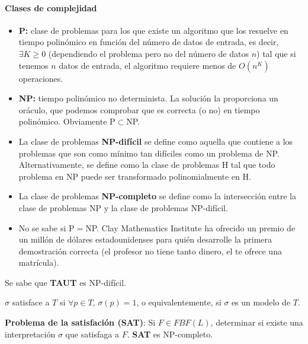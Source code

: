 \paragraph{Clases de complejidad}
\begin{itemize}
	\item \textbf{P:} clase de problemas para los que existe un algoritmo que los resuelve en tiempo polinómico en función del número de datos de entrada, es decir, $\exists K\ge 0$ (dependiendo el problema pero no del número de datos $n$) tal que si tenemos $n$ datos de entrada, el algoritmo requiere menos de $O(n^K)$ operaciones.
	\item \textbf{NP:} tiempo polinómico no determinista. La solución la proporciona un oráculo, que podemos comprobar que es correcta (o no) en tiempo polinómico. Obviamente P$\subset$NP.
		\item La clase de problemas \textbf{NP-difícil} se define como aquella que contiene a los problemas que son como mínimo tan difíciles como un problema de NP. Alternativamente, se define como la clase de problemas H tal que todo problema en NP puede ser transformado polinomialmente en H.
	\item La clase de problemas \textbf{NP-completo} se define como la intersección entre la clase de problemas NP y la clase de problemas NP-difícil.
	\item No se sabe si P$=$NP. Clay Mathematics Institute ha ofrecido un premio de un millón de dólares estadounidenses para quién desarrolle la primera demostración correcta (el profesor no tiene tanto dinero, el te ofrece una matrícula).
\end{itemize}
Se sabe que \textbf{TAUT} es NP-difícil.

\begin{defn}[Satisfación]
	$\sigma$ satisface a $T$ si $\forall p \in T$, $\sigma(p) = 1$, o equivalentemente, si $\sigma$ es un modelo de $T$.
\end{defn}

\begin{mdframed}
	\textbf{Problema de la satisfación (SAT)}: Si $F\in FBF(L)$, determinar si existe una interpretación $\sigma$ que satisfaga a $F$. \textbf{SAT} es {NP-completo}.
\end{mdframed}

